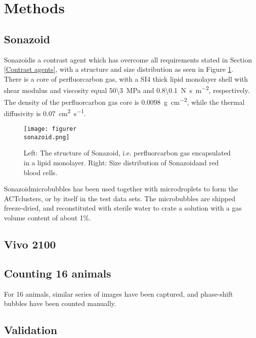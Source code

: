 \section{Methods}
\subsection{Sonazoid\texttrademark}
Sonazoid\texttrademark is a contrast agent which has overcome all requirements stated in Section \ref{Contrast agents}, with a structure and size distribution as seen in Figure \ref{Fig:Sonazoid}. There is a core of perfluorcarbon gas, with a SI{4}{\nano\metre} thick lipid monolayer shell with shear modulus and viscosity equal \SI{50\3}{\mega\pascal} and \SI{0.8\0.1}{\newton\second\per\metre\squared}, respectively\cite{Hoff2001}. The density of the perfluorcarbon gas core is \SI{0.0098}{\gram\per\centi\metre\squared}, while the thermal diffusivity is \SI{0.07}{\centi\metre\squared\per\second}\cite{Healey2012}. 

\begin{figure}[h]
  \centering
  \label{Fig:Sonazoid}
  \texttt{[image: figurer\\sonazoid.png]}
  \caption{Left: The structure of Sonazoid\texttrademark , i.e. perfluorcarbon gas encapsulated in a lipid monolayer. Right: Size distribution of Sonazoid\texttrademark and red blood cells\cite{Healey2012}.}
\end{figure}

Sonazoid\texttrademark microbubbles has been used together with microdroplets to form the ACT\texttrademark clusters, or by itself in the test data sets. The microbubbles are shipped freeze-dried, and reconstituted with sterile water to crate a solution with a gas volume content of about 1\%. %




\subsection{Vivo 2100}

\subsection{Counting 16 animals}
For 16 animals, similar series of images have been captured, and phase-shift bubbles have been counted manually.

\subsection{Validation}
